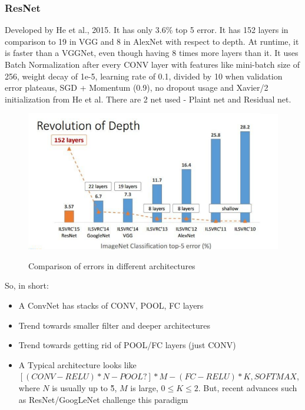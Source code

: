 \documentclass[12pt,a4paper]{article}
\begin{document}
\subsubsection{ResNet}
Developed by He et al., 2015. It has only 3.6\% top 5 error. It has 152 layers in comparison to 19 in VGG and 8 in AlexNet with respect to depth. At runtime, it is faster than a VGGNet, even though having 8 times more layers than it. It uses Batch Normalization after every CONV layer with features like mini-batch size of 256, weight decay of 1e-5, learning rate of 0.1, divided by 10 when validation error plateaus, SGD + Momentum (0.9), no dropout usage and Xavier/2 initialization from He et al. There are 2 net used - Plaint net and Residual net. 
\newpage
\begin{figure}[t]
    \centering
    \caption{Comparison of errors in different architectures}
    \includegraphics[width=1\textwidth]{ImageNet.png}
    \label{fig:exemplo}
\end{figure}
So, in short:
\begin{itemize}
    \item A ConvNet has stacks of CONV, POOL, FC layers
    \item Trend towards smaller filter and deeper architectures
    \item Trend towards getting rid of POOL/FC layers (just CONV)
    \item A Typical architecture looks like $[(CONV-RELU)*N-POOL?]*M-(FC-RELU)*K,SOFTMAX$, where $N$ is  usually up to \~5, $M$ is large, $0 \leq K \leq 2$. But, recent advances such as ResNet/GoogLeNet challenge this paradigm

\end{itemize}
\end{document}

